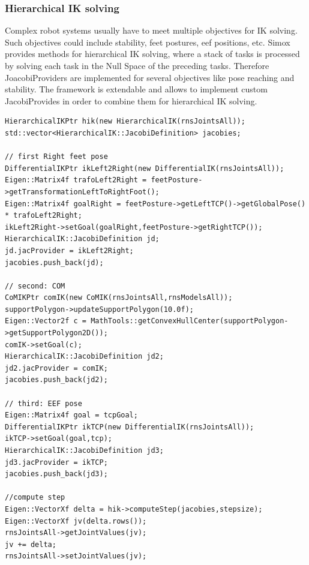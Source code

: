 \subsubsection{Hierarchical IK solving}
Complex robot systems usually have to meet multiple objectives for IK solving. Such objectives could include stability, feet postures, eef positions, etc. Simox provides methods for hierarchical IK solving, where a stack of tasks is processed by solving each task in the Null Space of the preceding tasks. Therefore JoacobiProviders are implemented for several objectives like pose reaching and stability. The framework is extendable and allows to implement custom JacobiProvides in order to combine them for hierarchical IK solving.
\begin{lstlisting}
HierarchicalIKPtr hik(new HierarchicalIK(rnsJointsAll));
std::vector<HierarchicalIK::JacobiDefinition> jacobies;

// first Right feet pose
DifferentialIKPtr ikLeft2Right(new DifferentialIK(rnsJointsAll));
Eigen::Matrix4f trafoLeft2Right = feetPosture->getTransformationLeftToRightFoot();
Eigen::Matrix4f goalRight = feetPosture->getLeftTCP()->getGlobalPose() * trafoLeft2Right;
ikLeft2Right->setGoal(goalRight,feetPosture->getRightTCP());
HierarchicalIK::JacobiDefinition jd;
jd.jacProvider = ikLeft2Right;
jacobies.push_back(jd);

// second: COM
CoMIKPtr comIK(new CoMIK(rnsJointsAll,rnsModelsAll));
supportPolygon->updateSupportPolygon(10.0f);
Eigen::Vector2f c = MathTools::getConvexHullCenter(supportPolygon->getSupportPolygon2D());
comIK->setGoal(c); 
HierarchicalIK::JacobiDefinition jd2;
jd2.jacProvider = comIK;
jacobies.push_back(jd2);

// third: EEF pose
Eigen::Matrix4f goal = tcpGoal;
DifferentialIKPtr ikTCP(new DifferentialIK(rnsJointsAll));
ikTCP->setGoal(goal,tcp);
HierarchicalIK::JacobiDefinition jd3;
jd3.jacProvider = ikTCP;
jacobies.push_back(jd3);

//compute step
Eigen::VectorXf delta = hik->computeStep(jacobies,stepsize);
Eigen::VectorXf jv(delta.rows());
rnsJointsAll->getJointValues(jv);
jv += delta;
rnsJointsAll->setJointValues(jv);
\end{lstlisting}
